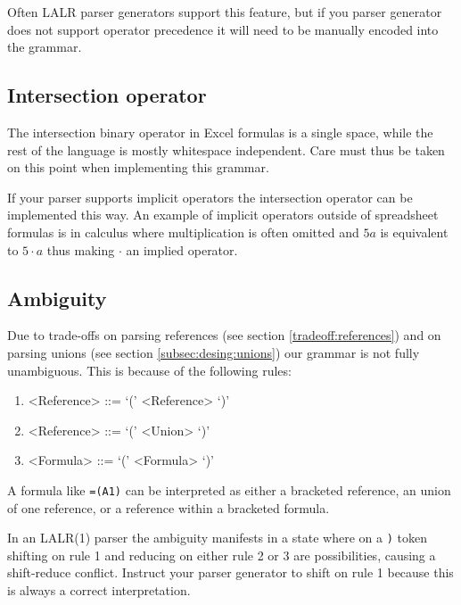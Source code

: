 \documentclass[conference]{IEEEtran}
\begin{document}
Often LALR parser generators support this feature, but if you parser generator does not support operator precedence it will need to be manually encoded into the grammar.

\subsection{Intersection operator}

The intersection binary operator in Excel formulas is a single space, while the rest of the language is mostly whitespace independent.
Care must thus be taken on this point when implementing this grammar.

If your parser supports implicit operators the intersection operator can be implemented this way.
An example of implicit operators outside of spreadsheet formulas is in calculus where multiplication is often omitted and $5a$ is equivalent to $5 \cdot a$ thus making $\cdot$ an implied operator.

\subsection{Ambiguity}

Due to trade-offs on parsing references (see section \ref{tradeoff:references}) and on parsing unions (see section \ref{subsec:desing:unions}) our grammar is not fully unambiguous.
This is because of the following rules:
\begin{enumerate}
\item \begin{grammar}<Reference> ::= `(' <Reference> `)'\end{grammar}
\item \begin{grammar}<Reference> ::= `(' <Union> `)'\end{grammar}
\item \begin{grammar}<Formula> ::= `(' <Formula> `)'\end{grammar}
\end{enumerate}

A formula like \texttt{=(A1)} can be interpreted as either a bracketed reference, an union of one reference, or a reference within a bracketed formula.

In an LALR(1) parser the ambiguity manifests in a state where on a \texttt{)} token shifting on rule 1 and reducing on either rule 2 or 3 are possibilities, causing a shift-reduce conflict.
Instruct your parser generator to shift on rule 1 because this is always a correct interpretation.
\end{document}
